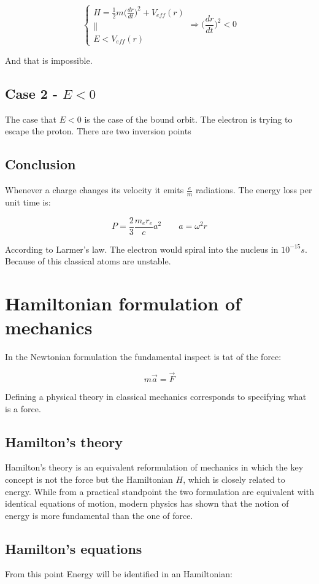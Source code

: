   $$\begin{cases} H = \frac{1}{2}m\biggl(\frac{d{r}}{d{t}}\biggr)^2+V_{eff}(r)\\
    \parallel\\
    E<V_{eff}(r)
  \end{cases}
  \Rightarrow \biggl(\frac{d{r}}{d{t}}\biggr)^2< 0$$

  And that is impossible.

  \subsection{Case 2 - $E<0$}
  The case that $E<0$ is the case of  the bound orbit.
  The electron is trying to escape the proton.
  There are two inversion points
  
  \subsection{Conclusion}
  Whenever a charge changes its velocity it emits $\frac{e}{m}$ radiations.
  The energy loss per unit time is:

  $$P = \frac{2}{3}\frac{m_er_e}{c}a^2\qquad a = \omega^2 r$$

  According to Larmer's law.
  The electron would spiral into the nucleus in $10^{-15}s$.
  Because of this classical atoms are unstable.

\section{Hamiltonian formulation of mechanics}
In the Newtonian formulation the fundamental inspect is tat of the force:

$$m \vec{a} = \vec{F}$$

Defining a physical theory in classical mechanics corresponds to specifying what is a force.

  \subsection{Hamilton's theory}
  Hamilton's theory is an equivalent reformulation of mechanics in which the key concept is not the force but the Hamiltonian $H$, which is closely related to energy.
  While from a practical standpoint the two formulation are equivalent with identical equations of motion, modern physics has shown that the notion of energy is more fundamental than the one of force.

  \subsection{Hamilton's equations}
  From this point Energy will be identified in an Hamiltonian:

